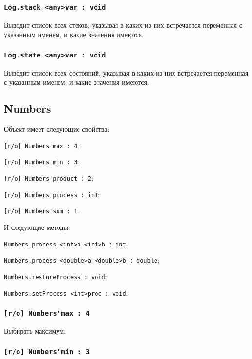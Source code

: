 \subsubsection{\lstinline|Log.stack <any>var : void|}

Выводит список всех стеков, указывая в каких из них встречается переменная с указанным именем, и какие значения имеются.

\subsubsection{\lstinline|Log.state <any>var : void|}

Выводит список всех состояний, указывая в каких из них встречается переменная с указанным именем, и какие значения имеются.

\subsection{{\color{orange} Numbers}}

Объект \numbers{} имеет следующие свойства:
\begin{icItems}
	\item \lstinline|[r/o] Numbers'max : 4|;
	\item \lstinline|[r/o] Numbers'min : 3|;
	\item \lstinline|[r/o] Numbers'product : 2|;
	\item \lstinline|[r/o] Numbers'process : int|;
	\item \lstinline|[r/o] Numbers'sum : 1|.
\end{icItems}

И следующие методы:
\begin{icItems}
	\item \lstinline|Numbers.process <int>a <int>b : int|;
	\item \lstinline|Numbers.process <double>a <double>b : double|;
	\item \lstinline|Numbers.restoreProcess : void|;
	\item \lstinline|Numbers.setProcess <int>proc : void|.
\end{icItems}

\subsubsection{\lstinline|[r/o] Numbers'max : 4|}

Выбирать максимум.

\subsubsection{\lstinline|[r/o] Numbers'min : 3|}

